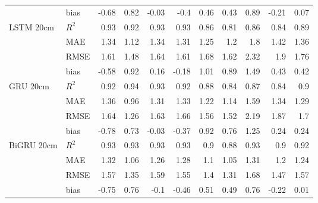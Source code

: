 \begin{tabular}{llrrrrrrrrr}
                                     & bias  & -0.68 &  0.82 & -0.03 & -0.4  & 0.46 &  0.43 & 0.89 & -0.21 &      0.07 \\
 LSTM 20cm                           & $R^2$ &  0.93 &  0.92 &  0.93 &  0.93 & 0.86 &  0.81 & 0.86 &  0.84 &      0.89 \\
                                     & MAE   &  1.34 &  1.12 &  1.34 &  1.31 & 1.25 &  1.2  & 1.8  &  1.42 &      1.36 \\
                                     & RMSE  &  1.61 &  1.48 &  1.64 &  1.61 & 1.68 &  1.62 & 2.32 &  1.9  &      1.76 \\
                                     & bias  & -0.58 &  0.92 &  0.16 & -0.18 & 1.01 &  0.89 & 1.49 &  0.43 &      0.42 \\
 GRU 20cm                            & $R^2$ &  0.92 &  0.94 &  0.93 &  0.92 & 0.88 &  0.84 & 0.87 &  0.84 &      0.9  \\
                                     & MAE   &  1.36 &  0.96 &  1.31 &  1.33 & 1.22 &  1.14 & 1.59 &  1.34 &      1.29 \\
                                     & RMSE  &  1.64 &  1.26 &  1.63 &  1.66 & 1.56 &  1.52 & 2.19 &  1.87 &      1.7  \\
                                     & bias  & -0.78 &  0.73 & -0.03 & -0.37 & 0.92 &  0.76 & 1.25 &  0.24 &      0.24 \\
 BiGRU 20cm                          & $R^2$ &  0.93 &  0.93 &  0.93 &  0.93 & 0.9  &  0.88 & 0.93 &  0.9  &      0.92 \\
                                     & MAE   &  1.32 &  1.06 &  1.26 &  1.28 & 1.1  &  1.05 & 1.31 &  1.2  &      1.24 \\
                                     & RMSE  &  1.57 &  1.35 &  1.59 &  1.55 & 1.4  &  1.31 & 1.68 &  1.47 &      1.57 \\
                                     & bias  & -0.75 &  0.76 & -0.1  & -0.46 & 0.51 &  0.49 & 0.76 & -0.22 &      0.01 \\
\hline
\end{tabular}